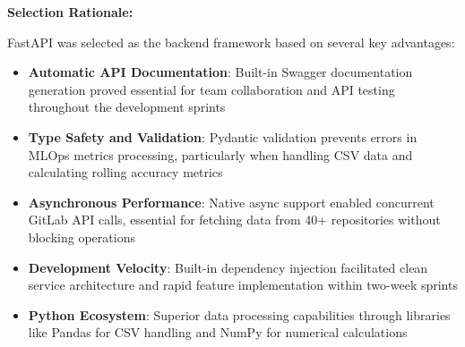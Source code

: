 \clearpage
\vspace{1cm}
\begin{table}[h!]
\centering
\renewcommand{\arraystretch}{1.8} %
\setlength{\arrayrulewidth}{0.3mm} %
\setlength{\tabcolsep}{4pt} %
\small
\noindent{}
\caption{Backend Framework Comparison}
\end{table}

\textbf{Selection Rationale:}

FastAPI was selected as the backend framework based on several key advantages:

\begin{itemize}
    \item \textbf{Automatic API Documentation}: Built-in Swagger documentation generation proved essential for team collaboration and API testing throughout the development sprints
    \item \textbf{Type Safety and Validation}: Pydantic validation prevents errors in MLOps metrics processing, particularly when handling CSV data and calculating rolling accuracy metrics
    \item \textbf{Asynchronous Performance}: Native async support enabled concurrent GitLab API calls, essential for fetching data from 40+ repositories without blocking operations
    \item \textbf{Development Velocity}: Built-in dependency injection facilitated clean service architecture and rapid feature implementation within two-week sprints
    \item \textbf{Python Ecosystem}: Superior data processing capabilities through libraries like Pandas for CSV handling and NumPy for numerical calculations
\end{itemize}

